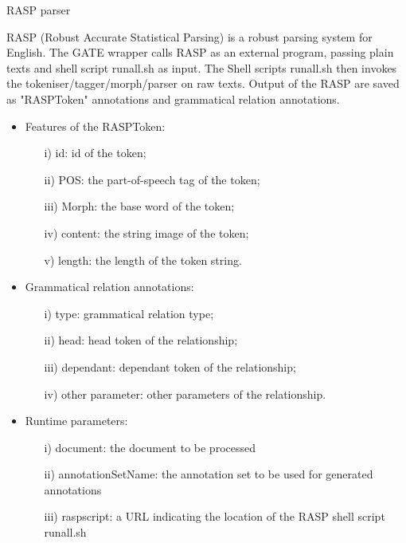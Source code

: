\documentclass[reqno]{article}
\begin{document}
\begin{center}
  \begin{Large}
     RASP parser
   \end{Large}
\end{center}


RASP (Robust Accurate Statistical Parsing) is a robust parsing system for English. The GATE wrapper calls RASP as an 
external program, passing plain texts and shell script runall.sh as input. The Shell scripts runall.sh then invokes  
the tokeniser/tagger/morph/parser on raw texts. Output of the RASP are saved as "RASPToken" annotations and 
grammatical relation annotations. 
\\


\begin{itemize}
\item Features of the RASPToken:
        \begin{itemize}
           \item[i)] id: id of the token;
           \item[ii)] POS: the part-of-speech tag of the token;
           \item[iii)]Morph: the base word of the token;
           \item[iv)] content: the string image of the token;
           \item[v)]  length: the length of the token string.
           \\
        \end{itemize}


\item Grammatical relation annotations:
          \begin{itemize}
            \item[i)] type: grammatical relation type;
            \item[ii)] head: head token of the relationship;
            \item[iii)] dependant: dependant token of the relationship;
            \item[iv)] other parameter: other parameters of the relationship.
            \\
          \end{itemize}

\item Runtime parameters:
         \begin{itemize}
            \item[i)]document: the document to be processed
            \item[ii)]annotationSetName: the annotation set to be used for generated annotations
            \item[iii)]raspscript: a URL indicating the location of the RASP shell script
 runall.sh
            \\
          \end{itemize}



\end{itemize}
\end{document}
